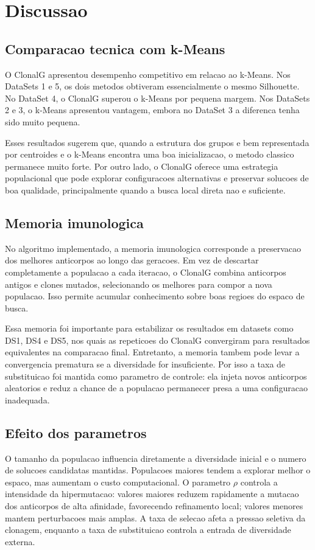 \documentclass[12pt,a4paper]{article}
\begin{document}
\section{Discussao}

\subsection{Comparacao tecnica com k-Means}
O ClonalG apresentou desempenho competitivo em relacao ao k-Means. Nos DataSets 1 e 5, os dois metodos obtiveram essencialmente o mesmo Silhouette. No DataSet 4, o ClonalG superou o k-Means por pequena margem. Nos DataSets 2 e 3, o k-Means apresentou vantagem, embora no DataSet 3 a diferenca tenha sido muito pequena.

Esses resultados sugerem que, quando a estrutura dos grupos e bem representada por centroides e o k-Means encontra uma boa inicializacao, o metodo classico permanece muito forte. Por outro lado, o ClonalG oferece uma estrategia populacional que pode explorar configuracoes alternativas e preservar solucoes de boa qualidade, principalmente quando a busca local direta nao e suficiente.

\subsection{Memoria imunologica}
No algoritmo implementado, a memoria imunologica corresponde a preservacao dos melhores anticorpos ao longo das geracoes. Em vez de descartar completamente a populacao a cada iteracao, o ClonalG combina anticorpos antigos e clones mutados, selecionando os melhores para compor a nova populacao. Isso permite acumular conhecimento sobre boas regioes do espaco de busca.

Essa memoria foi importante para estabilizar os resultados em datasets como DS1, DS4 e DS5, nos quais as repeticoes do ClonalG convergiram para resultados equivalentes na comparacao final. Entretanto, a memoria tambem pode levar a convergencia prematura se a diversidade for insuficiente. Por isso a taxa de substituicao foi mantida como parametro de controle: ela injeta novos anticorpos aleatorios e reduz a chance de a populacao permanecer presa a uma configuracao inadequada.

\subsection{Efeito dos parametros}
O tamanho da populacao influencia diretamente a diversidade inicial e o numero de solucoes candidatas mantidas. Populacoes maiores tendem a explorar melhor o espaco, mas aumentam o custo computacional. O parametro \(\rho\) controla a intensidade da hipermutacao: valores maiores reduzem rapidamente a mutacao dos anticorpos de alta afinidade, favorecendo refinamento local; valores menores mantem perturbacoes mais amplas. A taxa de selecao afeta a pressao seletiva da clonagem, enquanto a taxa de substituicao controla a entrada de diversidade externa.
\end{document}
